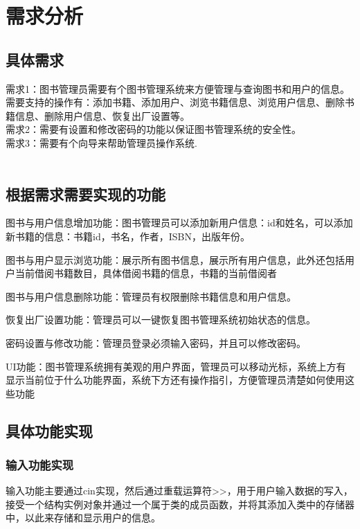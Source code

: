 \documentclass{article}
\begin{document}
\section{需求分析}

\subsection{具体需求}

需求1：图书管理员需要有个图书管理系统来方便管理与查询图书和用户的信息。需要支持的操作有：添加书籍、添加用户、浏览书籍信息、浏览用户信息、删除书籍信息、删除用户信息、恢复出厂设置等。\\
需求2：需要有设置和修改密码的功能以保证图书管理系统的安全性。\\
需求3：需要有个向导来帮助管理员操作系统.\\\\

\subsection{根据需求需要实现的功能}
图书与用户信息增加功能：图书管理员可以添加新用户信息：id和姓名，可以添加新书籍的信息：书籍id，书名，作者，ISBN，出版年份。

图书与用户显示浏览功能：展示所有图书信息，展示所有用户信息，此外还包括用户当前借阅书籍数目，具体借阅书籍的信息，书籍的当前借阅者

图书与用户信息删除功能：管理员有权限删除书籍信息和用户信息。

恢复出厂设置功能：管理员可以一键恢复图书管理系统初始状态的信息。

密码设置与修改功能：管理员登录必须输入密码，并且可以修改密码。

UI功能：图书管理系统拥有美观的用户界面，管理员可以移动光标，系统上方有显示当前位于什么功能界面，系统下方还有操作指引，方便管理员清楚如何使用这些功能\\
\subsection{具体功能实现}
\subsubsection{输入功能实现}
输入功能主要通过cin实现，然后通过重载运算符>>，用于用户输入数据的写入，接受一个结构实例对象并通过一个属于类的成员函数，并将其添加入类中的存储器中，以此来存储和显示用户的信息。\\
\end{document}
